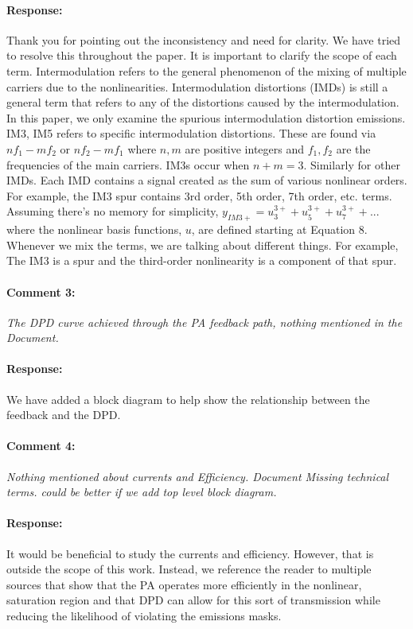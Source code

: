 \documentclass[]{article}
\begin{document}
\paragraph{Response:}
Thank you for pointing out the inconsistency and need for clarity. We have tried to resolve this throughout the paper. It is important to clarify the scope of each term. Intermodulation refers to the general phenomenon of the mixing of multiple carriers due to the nonlinearities. Intermodulation distortions (IMDs) is still a general term that refers to any of the distortions caused by the intermodulation. In this paper, we only examine the spurious intermodulation distortion emissions. IM3, IM5 refers to specific intermodulation distortions. These are found via $n f_1 - m f_2$ or  $n f_2 - m f_1$ where $n,m$ are positive integers and $f_1, f_2$ are the frequencies of the main carriers. IM3s occur when $n+m = 3$. Similarly for other IMDs. Each IMD contains a signal created as the sum of various nonlinear orders. For example, the IM3 spur contains 3rd order, 5th order, 7th order, etc. terms. Assuming there's no memory for simplicity, $y_{IM3+} = u_3^{3+} + u_5^{3+} + u_7^{3+} + ...$ where the nonlinear basis functions, $u$, are defined starting at Equation 8. Whenever we mix the terms, we are talking about different things. For example, The IM3 is a spur and the third-order nonlinearity is a component of that spur. 

\paragraph{Comment 3:}\textit{The DPD curve achieved through the PA feedback path, nothing mentioned in the Document.}
\paragraph{Response:}
We have added a block diagram to help show the relationship between the feedback and the DPD. 
	
\paragraph{Comment 4:}\textit{Nothing mentioned about currents and Efficiency. Document Missing technical terms. could be better if we add top level block diagram.
}
\paragraph{Response:}
It would be beneficial to study the currents and efficiency. However, that is outside the scope of this work. Instead, we reference the reader to multiple sources that show that the PA operates more efficiently in the nonlinear, saturation region and that DPD can allow for this sort of transmission while reducing the likelihood of violating the emissions masks. 
\end{document}
